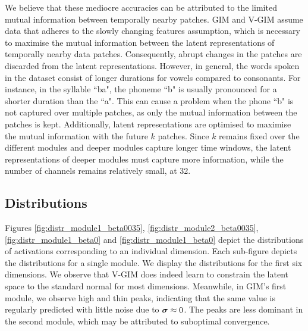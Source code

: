 	We believe that these mediocre accuracies can be attributed to the limited mutual information between temporally nearby patches. GIM and V-GIM assume data that adheres to the slowly changing features assumption, which is necessary to maximise the mutual information between the latent representations of temporally nearby data patches. Consequently, abrupt changes in the patches are discarded from the latent representations. 
	However, in general, the words spoken in the dataset consist of longer durations for vowels compared to consonants. For instance, in the syllable ``ba", the phoneme ``b" is usually pronounced for a shorter duration than the ``a". This can cause a problem when the phone ``b" is not captured over multiple patches, as only the mutual information between the patches is kept. Additionally, latent representations are optimised to maximise the mutual information with the future $k$ patches. Since $k$ remains fixed over the different modules and deeper modules capture longer time windows, the latent representations of deeper modules must capture more information, while the number of channels remains relatively small, at 32.
	
				
	\subsection{Distributions} \label{cha:distributions}
		Figures \ref{fig:distr_module1_beta0035}, \ref{fig:distr_module2_beta0035}, \ref{fig:distr_module1_beta0} and \ref{fig:distr_module1_beta0} depict the distributions of activations corresponding to an individual dimension. Each sub-figure depicts the distributions for a single module. We display the distributions for the first six dimensions. We observe that V-GIM does indeed learn to constrain the latent space to the standard normal for most dimensions. Meanwhile, in GIM's first module, we observe high and thin peaks, indicating that the same value is regularly predicted with little noise due to $\bm{\sigma} \approx 0$. The peaks are less dominant in the second module, which may be attributed to suboptimal convergence.
		

		


